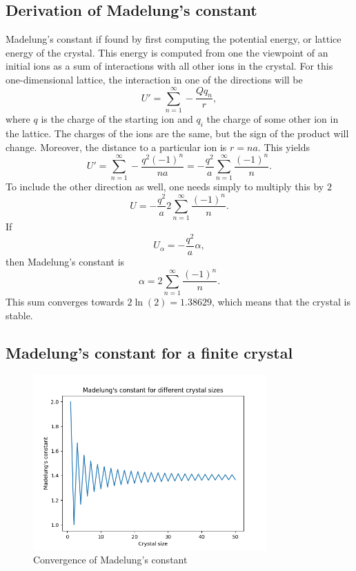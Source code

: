 \documentclass[10pt, a4paper]{amsart}
\begin{document}
\subsection{Derivation of Madelung's constant}

Madelung's constant if found by first computing the potential energy, or lattice energy of the crystal. This energy is computed from one the viewpoint of an initial ions as a sum of interactions with all other ions in the crystal. For this one-dimensional lattice, the interaction in one of the directions will be
\begin{equation}
U' = \sum_{n=1}^\infty -\frac{Qq_n}{r},
\end{equation}
where $q$ is the charge of the starting ion and $q_i$ the charge of some other ion in the lattice. The charges of the ions are the same, but the sign of the product will change. Moreover, the distance to a particular ion is $r=na$. This yields
\begin{equation}
U' = \sum_{n=1}^\infty -\frac{q^2(-1)^n}{na} = -\frac{q^2}{a}\sum_{n=1}^\infty \frac{(-1)^n}{n}.
\end{equation}
To include the other direction as well, one needs simply to multiply this by $2$
\begin{equation}
U = -\frac{q^2}{a} 2\sum_{n=1}^\infty \frac{(-1)^n}{n}.
\end{equation}
If
\begin{equation}
U_\alpha = -\frac{q^2}{a}\alpha,
\end{equation}
then Madelung's constant is
\begin{equation}
\alpha = 2\sum_{n=1}^\infty \frac{(-1)^n}{n}.
\end{equation}
This sum converges towards $2\ln(2)= 1.38629$, which means that the crystal is stable.

\subsection{Madelung's constant for a finite crystal}

\begin{figure}
	\centering
	\includegraphics[width=0.8\textwidth]{./figures/madelung.png}
	\caption{Convergence of Madelung's constant}
	\label{fig:madelung}
\end{figure}
\end{document}
